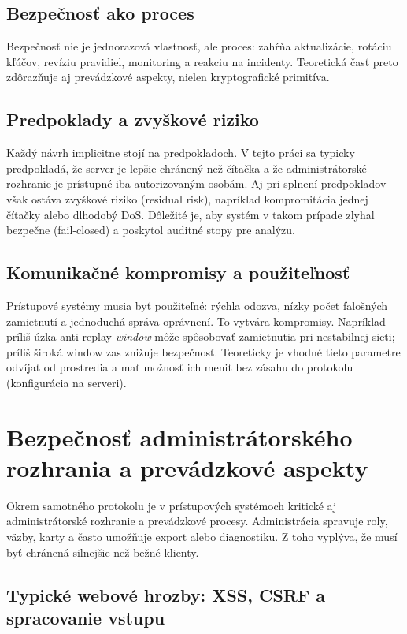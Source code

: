 \documentclass[journal,a4paper,onecolumn]{IEEEtran}
\begin{document}
\subsection{Bezpečnosť ako proces}

Bezpečnosť nie je jednorazová vlastnosť, ale proces: zahŕňa aktualizácie, rotáciu kľúčov, revíziu pravidiel, monitoring a reakciu na incidenty. Teoretická časť preto zdôrazňuje aj prevádzkové aspekty, nielen kryptografické primitíva.

\subsection{Predpoklady a zvyškové riziko}

Každý návrh implicitne stojí na predpokladoch. V tejto práci sa typicky predpokladá, že server je lepšie chránený než čítačka a že administrátorské rozhranie je prístupné iba autorizovaným osobám. Aj pri splnení predpokladov však ostáva zvyškové riziko (residual risk), napríklad kompromitácia jednej čítačky alebo dlhodobý DoS. Dôležité je, aby systém v takom prípade zlyhal bezpečne (fail-closed) a poskytol auditné stopy pre analýzu.

\subsection{Komunikačné kompromisy a použiteľnosť}

Prístupové systémy musia byť použiteľné: rýchla odozva, nízky počet falošných zamietnutí a jednoduchá správa oprávnení. To vytvára kompromisy. Napríklad príliš úzka anti-replay \emph{window} môže spôsobovať zamietnutia pri nestabilnej sieti; príliš široká window zas znižuje bezpečnosť. Teoreticky je vhodné tieto parametre odvíjať od prostredia a mať možnosť ich meniť bez zásahu do protokolu (konfigurácia na serveri).

\section{Bezpečnosť administrátorského rozhrania a prevádzkové aspekty}

Okrem samotného protokolu je v prístupových systémoch kritické aj administrátorské rozhranie a prevádzkové procesy. Administrácia spravuje roly, väzby, karty a často umožňuje export alebo diagnostiku. Z toho vyplýva, že musí byť chránená silnejšie než bežné klienty.

\subsection{Typické webové hrozby: XSS, CSRF a spracovanie vstupu}
\end{document}
